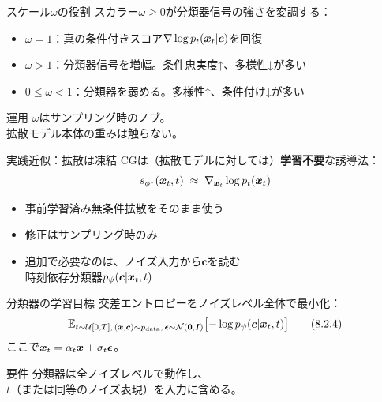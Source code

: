 \asmain
\begin{frame}{スケール$\omega$の役割}
    スカラー$\omega\ge 0$が分類器信号の強さを変調する：
    \begin{itemize}
        \item $\omega=1$：真の条件付きスコア$\nabla\log p_t(\bm{x}_t|\bm{c})$を回復
        \item $\omega>1$：分類器信号を増幅。条件忠実度↑、多様性↓が多い
        \item $0\le\omega<1$：分類器を弱める。多様性↑、条件付け↓が多い
    \end{itemize}
    \begin{exampleblock}{運用}
        $\omega$はサンプリング時のノブ。\\
        拡散モデル本体の重みは触らない。
    \end{exampleblock}
\end{frame}
\asmain
\begin{frame}{実践近似：拡散は凍結}
    CGは（拡散モデルに対しては）\textbf{学習不要}な誘導法：
    \[
        s_{\phi^\star}(\bm{x}_t,t)
        \;\approx\;
        \nabla_{\bm{x}_t}\log p_t(\bm{x}_t)
    \]
    \begin{itemize}
        \item 事前学習済み無条件拡散をそのまま使う
        \item 修正はサンプリング時のみ
        \item 追加で必要なのは、ノイズ入力から$\bm{c}$を読む\\
        時刻依存分類器$p_\psi(\bm{c}|\bm{x}_t,t)$
    \end{itemize}
\end{frame}
\asmain
\begin{frame}{分類器の学習目標}
    交差エントロピーをノイズレベル全体で最小化：
    \[
        \mathbb{E}_{t\sim\mathcal{U}[0,T],\,(\bm{x},\bm{c})\sim p_{\mathrm{data}},\,\bm{\epsilon}\sim\mathcal{N}(\bm{0},\bm{I})}
        \bigl[
        -\log p_\psi(\bm{c}|\bm{x}_t,t)
        \bigr]
        \tag{8.2.4}
    \]
    ここで$\bm{x}_t=\alpha_t\bm{x}+\sigma_t\bm{\epsilon}$。
    \begin{block}{要件}
        分類器は全ノイズレベルで動作し、\\
        $t$（または同等のノイズ表現）を入力に含める。
    \end{block}
\end{frame}
\assuppl
